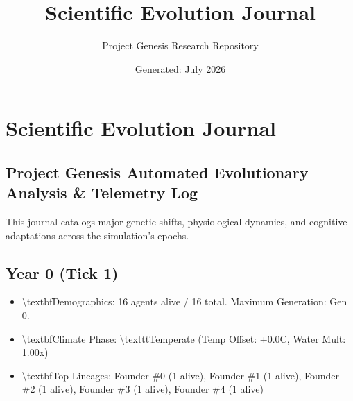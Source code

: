 \documentclass[11pt,a4paper]{article}
\title{\textbf{Scientific Evolution Journal}}
\author{Project Genesis Research Repository}
\date{\small Generated: July 2026}
\begin{document}
\maketitle
\thispagestyle{empty}

\newpage
\section*{ Scientific Evolution Journal}
\subsection*{Project Genesis  Automated Evolutionary Analysis \& Telemetry Log}

This journal catalogs major genetic shifts, physiological dynamics, and cognitive adaptations across the simulation's epochs.

\subsection*{ Year 0 (Tick 1)}
\begin{itemize}
  \item \textbackslash{}textbf{Demographics:} 16 agents alive / 16 total. Maximum Generation: Gen 0.
  \item \textbackslash{}textbf{Climate Phase:} \textbackslash{}texttt{Temperate} (Temp Offset: +0.0C, Water Mult: 1.00x)
  \item \textbackslash{}textbf{Top Lineages:} Founder \#0 (1 alive), Founder \#1 (1 alive), Founder \#2 (1 alive), Founder \#3 (1 alive), Founder \#4 (1 alive)
\end{itemize}
\end{document}
